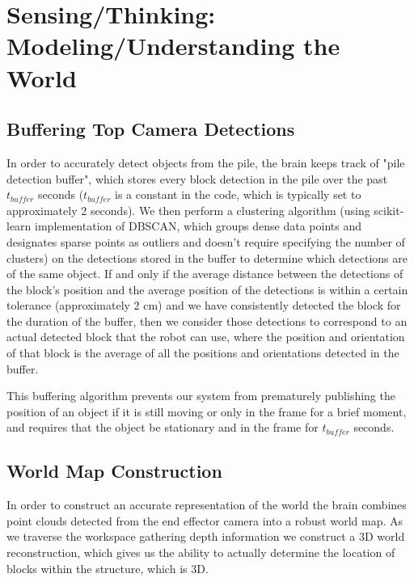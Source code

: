 \section{Sensing/Thinking: Modeling/Understanding the World}

\subsection{Buffering Top Camera Detections}

In order to accurately detect objects from the pile, the brain keeps track of "pile detection buffer", which stores every block detection in the pile over the past $t_{buffer}$ seconds ($t_{buffer}$ is a constant in the code, which is typically set to approximately 2 seconds). We then perform a clustering algorithm (using scikit-learn implementation of DBSCAN, which groups dense data points and designates sparse points as outliers and doesn't require specifying the number of clusters) on the detections stored in the buffer to determine which detections are of the same object. If and only if the average distance between the detections of the block's position and the average position of the detections is within a certain tolerance (approximately 2 cm) and we have consistently detected the block for the duration of the buffer, then we consider those detections to correspond to an actual detected block that the robot can use, where the position and orientation of that block is the average of all the positions and orientations detected in the buffer. 

\noindent This buffering algorithm prevents our system from prematurely publishing the position of an object if it is still moving or only in the frame for a brief moment, and requires that the object be stationary and in the frame for $t_{buffer}$ seconds.



\subsection{World Map Construction}
In order to construct an accurate representation of the world the brain combines point clouds detected from the end effector camera into a robust world map. As we traverse the workspace gathering depth information we construct a 3D world reconstruction, which gives us the ability to actually determine the location of blocks within the structure, which is 3D. 

